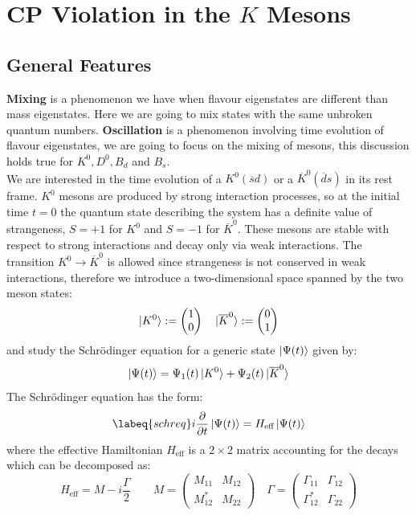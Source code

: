 \documentclass[../main.tex]{subfiles}
\begin{document}
\section{CP Violation in the $K$ Mesons}
\subsection{General Features}
\textbf{Mixing} is a phenomenon we have when flavour eigenstates are different than mass eigenstates. Here we are going to mix states with the same unbroken quantum numbers. \textbf{Oscillation} is a phenomenon involving time evolution of flavour eigenstates, we are going to focus on the mixing of mesons, this discussion holds true for $K^0, D^0, B_d$ and $B_s$.\\
We are interested in the time evolution of a $K^0 (\overline{s}d)$ or a $\overline{K}^0 (\overline{d}s)$ in its rest frame. $K^0$ mesons are produced by strong interaction processes, so at the initial time $t=0$ the quantum state describing the system has a definite value of strangeness, $S=+1$ for $K^0$ and $S=-1$ for $\overline{K}^0$. These mesons are stable with respect to strong interactions and decay only via weak interactions. The transition $K^0\to\overline{K}^0$ is allowed since strangeness is not conserved in weak interactions, therefore we introduce a two-dimensional space spanned by the two meson states:
\[
\ket{K^0}:=\begin{pmatrix}1\\0\end{pmatrix} \quad \ket{\overline{K}^0}:=\begin{pmatrix}0\\1\end{pmatrix}
\]
and study the Schr\"odinger equation for a generic state $\ket{\Psi(t)}$ given by:
\[
\ket{\Psi(t)}=\Psi_1(t)\ket{K^0}+\Psi_2(t)\ket{\overline{K}^0}
\]
The Schr\"odinger equation has the form:
\begin{equation}
\labeq{schreq} 
i\frac{\partial}{\partial t}\ket{\Psi(t)}=H_{\text{eff}}\ket{\Psi(t)}
\end{equation}
where the effective Hamiltonian $H_{\text{eff}}$ is a $2\times2$ matrix accounting for the decays which can be decomposed as:
\[
H_{\text{eff}}=M-i\frac{\Gamma}{2} \qquad M=\left(\begin{array}{cc}
    M_{11} & M_{12} \\
    M^*_{12} & M_{22}
\end{array}\right) \quad \Gamma=\left(\begin{array}{cc}
    \Gamma_{11} & \Gamma_{12} \\
    \Gamma^*_{12} & \Gamma_{22}
\end{array}\right)
\]
\end{document}
